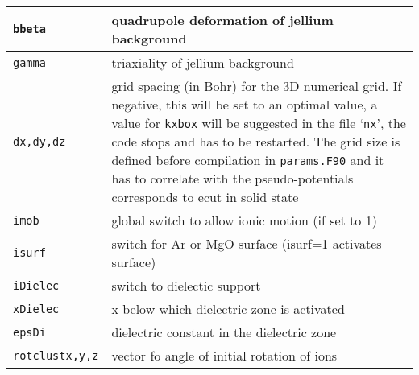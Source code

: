 \documentclass[11pt,a4paper]{article}
\begin{document}
\begin{table}[h]
\begin{tabular}{|p{3.5cm}|p{11.2cm}|}
				\hline
				\texttt{bbeta         }& quadrupole deformation of jellium background\\
				\hline
				\texttt{gamma         }& triaxiality of jellium background\\
				\hline
				\texttt{dx,dy,dz        }& grid spacing (in  Bohr) for the 3D numerical grid. If negative, this will be set to an optimal value, a value for \texttt{kxbox}  will be suggested in the file `\texttt{nx}', the code stops and has to be restarted. The grid size is defined before compilation in \texttt{params.F90} and it has to correlate with the pseudo-potentials corresponds to ecut in solid state\\
				\hline
				\texttt{imob}& global switch to allow ionic motion (if set to 1) \\
				\hline
				\texttt{isurf}& switch for Ar or MgO surface (isurf=1 activates surface)\\
				\hline
				\texttt{iDielec}& switch to dielectic support\\
				\hline
				\texttt{xDielec}& x below which dielectric zone is activated\\
				\hline
				\texttt{epsDi}& dielectric constant in the dielectric zone\\
				\hline
				\texttt{rotclustx,y,z} & vector fo angle of initial rotation of ions\\
				\hline
			\end{tabular}
		\end{table}
\end{document}
